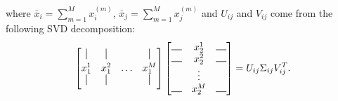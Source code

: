 \documentclass{article}
\newcommand*{\vertbar}{\rule[0ex]{0.5pt}{2.5ex}}
\newcommand*{\horizbar}{\rule[0ex]{2.5ex}{0.5pt}}
\begin{document}
where $\bar x_i = \sum_{m=1}^{M} x_i^{(m)}$, $\bar x_j = \sum_{m=1}^{M} x_j^{(m)}$ and $U_{ij}$ and $V_{ij}$ come from the following SVD decomposition:
\begin{equation}
\begin{bmatrix}
\vertbar & \vertbar &        & \vertbar \\
x_1^{1}  & x_1^{2}  & \ldots & x_1^{M}    \\
\vertbar & \vertbar &        & \vertbar 
\end{bmatrix}\begin{bmatrix}
\horizbar & x_2^{1} & \horizbar \\
\horizbar & x_2^{2} & \horizbar \\
          & \vdots  &           \\
\horizbar & x_2^{M} & \horizbar
\end{bmatrix}=U_{ij}\Sigma_{ij} V_{ij}^T.
\end{equation}
\end{document}
